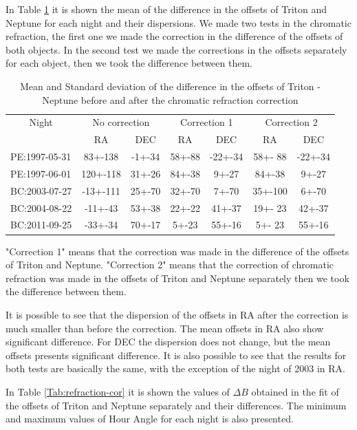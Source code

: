 \documentclass[12pt,a4paper]{report}
\begin{document}
In Table \ref{Tab:refraction} it is shown the mean of the difference in the offsets of Triton and Neptune for each night and their dispersions. We made two tests in the chromatic refraction, the first one we made the correction in the difference of the offsets of both objects. In the second test we made the corrections in the offsets separately for each object, then we took the difference between them.

\begin{table}[h]
\centering
\caption{Mean and Standard deviation of the difference in the offsets of Triton - Neptune before and after the chromatic refraction correction}
\label{Tab:refraction}
\begin{tabular}{|l|c|c|c|c|c|c|}
\hline
 \multicolumn{1}{|c|}{Night} & \multicolumn{2}{|c|}{No correction} & \multicolumn{2}{|c|}{Correction 1} & \multicolumn{2}{|c|}{Correction 2}\\
  & RA & DEC & RA & DEC & RA & DEC \\
 \hline
PE:1997-05-31 &   83+-138 & -1+-34 &  58+-88 & -22+-34 & 58+- 88 & -22+-34 \\
PE:1997-06-01 &   120+-118 &  31+-26 &  84+-38 &  9+-27 & 84+-38 &  9+-27 \\
BC:2003-07-27  &  -13+-111 & 25+-70 &  32+-70 &  7+-70 & 35+-100 &  6+-70 \\
BC:2004-08-22  &   -11+-43 & 53+-38 &  22+-22 & 41+-37 & 19+- 23 & 42+-37 \\
BC:2011-09-25  &   -33+-34 & 70+-17 &   5+-23 & 55+-16  &  5+- 23 & 55+-16 \\
\hline
\end{tabular}
"Correction 1" means that the correction was made in the difference of the offsets of Triton and Neptune. "Correction 2" means that the correction of chromatic refraction was made in the offsets of Triton and Neptune separately then we took the difference between them.
\end{table}

It is possible to see that the dispersion of the offsets in RA after the correction is much smaller than before the correction. The mean offsets in RA also show significant difference. For DEC the dispersion does not change, but the mean offsets presents significant difference. It is also possible to see that the results for both tests are basically the same, with the exception of the night of 2003 in RA.

In Table \ref{Tab:refraction-cor} it is shown the values of $\Delta B$ obtained in the fit of the offsets of Triton and Neptune separately and their differences. The minimum and maximum values of Hour Angle for each night is also presented.
\end{document}
